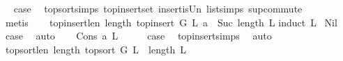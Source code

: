 \begin{isabellebody}
\ \isamarkupfalse%
\ {\isacharquery}{\kern0pt}case\ \isamarkupfalse%
\ top{\isacharunderscore}{\kern0pt}sort{\isachardot}{\kern0pt}simps{\isacharparenleft}{\kern0pt}{}{\isacharparenright}{\kern0pt}\ top{\isacharunderscore}{\kern0pt}insert{\isacharunderscore}{\kern0pt}set\ insert{\isacharunderscore}{\kern0pt}is{\isacharunderscore}{\kern0pt}Un\ list{\isachardot}{\kern0pt}simps{\isacharparenleft}{\kern0pt}{}{}{\isacharparenright}{\kern0pt}\ sup{\isacharunderscore}{\kern0pt}commute\isanewline
\ \ \ \ \isamarkupfalse%
\ {\isacharparenleft}{\kern0pt}metis{\isacharparenright}{\kern0pt}\ \isanewline
{}\isamarkupfalse%
%
\endisatagproof
{\isafoldproof}%
%
\isadelimproof
\isanewline
%
\endisadelimproof
\ \isanewline
\isanewline
{}\isamarkupfalse%
\ top{\isacharunderscore}{\kern0pt}insert{\isacharunderscore}{\kern0pt}len{\isacharcolon}{\kern0pt}\ {\isachardoublequoteopen}length\ {\isacharparenleft}{\kern0pt}top{\isacharunderscore}{\kern0pt}insert\ G\ L\ a{\isacharparenright}{\kern0pt}\ {\isacharequal}{\kern0pt}\ Suc\ {\isacharparenleft}{\kern0pt}length\ L{\isacharparenright}{\kern0pt}{\isachardoublequoteclose}\isanewline
%
\isadelimproof
%
\endisadelimproof
%
\isatagproof
{}\isamarkupfalse%
{\isacharparenleft}{\kern0pt}induct\ L{\isacharparenright}{\kern0pt}\isanewline
{}\isamarkupfalse%
\ Nil\isanewline
{}\isamarkupfalse%
\ \isamarkupfalse%
\ {\isacharquery}{\kern0pt}case\ \isamarkupfalse%
\ auto\isanewline
{}\isamarkupfalse%
\isanewline
\ \ \isamarkupfalse%
\ {\isacharparenleft}{\kern0pt}Cons\ a\ L{\isacharparenright}{\kern0pt}\isanewline
\ \ \isamarkupfalse%
\ \isamarkupfalse%
\ {\isacharquery}{\kern0pt}case\ \isamarkupfalse%
\ top{\isacharunderscore}{\kern0pt}insert{\isachardot}{\kern0pt}simps{\isacharparenleft}{\kern0pt}{}{\isacharparenright}{\kern0pt}\ \isamarkupfalse%
\ auto\isanewline
{}\isamarkupfalse%
%
\endisatagproof
{\isafoldproof}%
%
\isadelimproof
\isanewline
%
\endisadelimproof
\isanewline
{}\isamarkupfalse%
\ top{\isacharunderscore}{\kern0pt}sort{\isacharunderscore}{\kern0pt}len{\isacharcolon}{\kern0pt}\ {\isachardoublequoteopen}length\ {\isacharparenleft}{\kern0pt}top{\isacharunderscore}{\kern0pt}sort\ G\ L{\isacharparenright}{\kern0pt}\ {\isacharequal}{\kern0pt}\ length\ L{\isachardoublequoteclose}\isanewline
%
\isadelimproof

\end{isabellebody}
